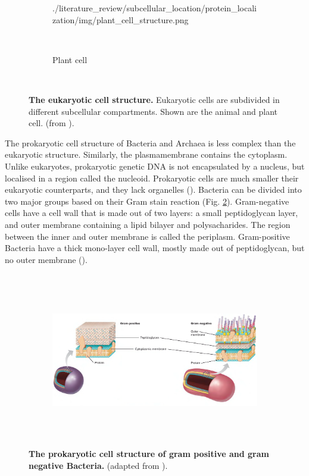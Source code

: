 \begin{figure}[h!]
\begin{subfigure}[b]{0.48\linewidth}
	{./literature_review/subcellular_location/protein_localization/img/plant_cell_structure.png}
  \caption{Plant cell}
  ~\end{subfigure}
  \caption{
\textbf{The eukaryotic cell structure.} 
Eukaryotic cells are subdivided in different subcellular compartments.
Shown are the animal and plant cell.
(from \cite{boundless_biology_eukaryotic}).
}
  \label{fig:eukaryotic_cell_structure}
~\end{figure}

The prokaryotic cell structure of Bacteria and Archaea is less complex than the eukaryotic structure.
Similarly, the plasmamembrane contains the cytoplasm.
Unlike eukaryotes, prokaryotic genetic DNA is not encapsulated by a nucleus,
but localised in a region called the nucleoid.
Prokaryotic cells are much smaller their eukaryotic counterparts,
and they lack organelles
(\cite{boundless_biology_prokaryotic}).
Bacteria can be divided into two major groups based on their Gram stain reaction
(Fig. \ref{fig:prokaryotic_cell_structure}).
Gram-negative cells have a cell wall that is made out of two layers:
a small peptidoglycan layer, 
and outer membrane containing a lipid bilayer and polysacharides.
The region between the inner and outer membrane is called the periplasm.
Gram-positive Bacteria have a thick mono-layer cell wall, mostly made out of peptidoglycan,
but no outer membrane
(\cite{madigan2015}).


~\begin{figure}[h!]
  \centering
  ~\begin{subfigure}[b]{\linewidth}
    \includegraphics[width=\linewidth]
	{./literature_review/subcellular_location/protein_localization/img/gram_pos_vs_neg.png}
  ~\end{subfigure}
  \caption{
\textbf{The prokaryotic cell structure of gram positive and gram negative Bacteria.} 
(adapted from \cite{madigan2015}).
}
  \label{fig:prokaryotic_cell_structure}
~\end{figure}


